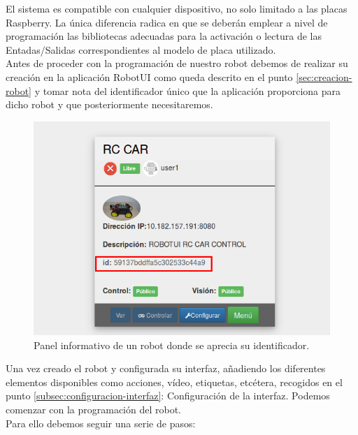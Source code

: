 El sistema es compatible con cualquier dispositivo, no solo limitado a las placas Raspberry. La única diferencia radica en que se deberán emplear a nivel de programación las bibliotecas adecuadas 
para la activación o lectura de las Entadas/Salidas correspondientes al modelo de placa utilizado.\\

Antes de proceder con la programación de nuestro robot debemos de realizar su creación en la aplicación RobotUI como queda descrito en el punto \ref{sec:creacion-robot} y 
tomar nota del identificador único que la aplicación proporciona para dicho robot y que posteriormente necesitaremos.\\	

\begin{figure}[H]
  \begin{center}
    \includegraphics[scale=.6]{imagenes/manual-usuario/identificador.png}
  \end{center}
  \caption{Panel informativo de un robot donde se aprecia su identificador.}
  \label{website:pagina-principal}
\end{figure}


Una vez creado el robot y configurada su interfaz, añadiendo los diferentes elementos disponibles como acciones, vídeo, etiquetas, etcétera, recogidos en el punto \ref{subsec:configuracion-interfaz}: Configuración de la interfaz.
Podemos comenzar con la programación del robot.\\

Para ello debemos seguir una serie de pasos:\\

